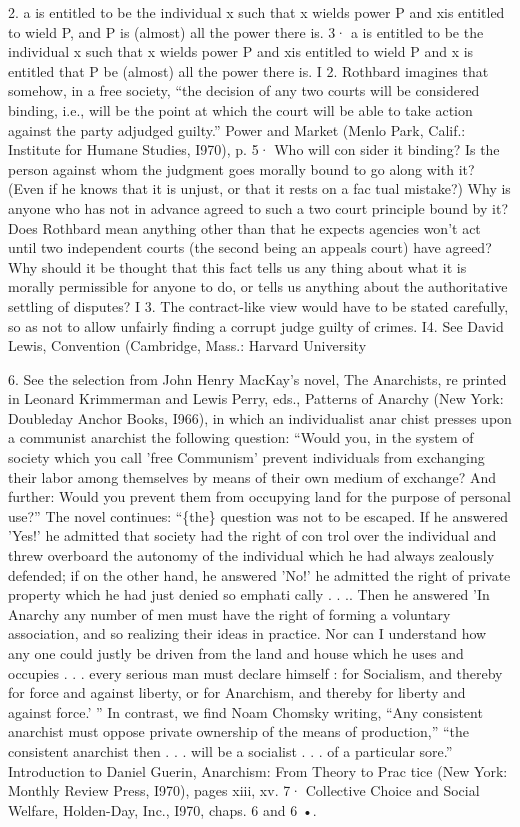 \documentclass[11pt,openany]{book}
\begin{document}
{2. a is entitled to be the individual x such that x wields power P and xis entitled to wield P, and P is (almost) all the power there is. 3· a is entitled to be the individual x such that x wields power P and xis entitled to wield P and x is entitled that P be (almost) all the power there is. I 2. Rothbard imagines that somehow, in a free society, ``the decision of any two courts will be considered binding, i.e., will be the point at which the court will be able to take action against the party adjudged guilty.'' Power and Market (Menlo Park, Calif.: Institute for Humane Studies, I970), p. 5· Who will con sider it binding? Is the person against whom the judgment goes morally bound to go along with it? (Even if he knows that it is unjust, or that it rests on a fac tual mistake?) Why is anyone who has not in advance agreed to such a two court principle bound by it? Does Rothbard mean anything other than that he expects agencies won't act until two independent courts (the second being an appeals court) have agreed? Why should it be thought that this fact tells us any thing about what it is morally permissible for anyone to do, or tells us anything about the authoritative settling of disputes? I 3. The contract-like view would have to be stated carefully, so as not to allow unfairly finding a corrupt judge guilty of crimes. I4. See David Lewis, Convention (Cambridge, Mass.: Harvard University\par

6. See the selection from John Henry MacKay's novel, The Anarchists, re printed in Leonard Krimmerman and Lewis Perry, eds., Patterns of Anarchy (New York: Doubleday Anchor Books, I966), in which an individualist anar chist presses upon a communist anarchist the following question: ``Would you, in the system of society which you call 'free Communism' prevent individuals from exchanging their labor among themselves by means of their own medium of exchange? And further: Would you prevent them from occupying land for the purpose of personal use?'' The novel continues: ``\{the\} question was not to be escaped. If he answered 'Yes!' he admitted that society had the right of con trol over the individual and threw overboard the autonomy of the individual which he had always zealously defended; if on the other hand, he answered 'No!' he admitted the right of private property which he had just denied so emphati cally . . .. Then he answered 'In Anarchy any number of men must have the right of forming a voluntary association, and so realizing their ideas in practice. Nor can I understand how any one could justly be driven from the land and house which he uses and occupies . . . every serious man must declare himself : for Socialism, and thereby for force and against liberty, or for Anarchism, and thereby for liberty and against force.' '' In contrast, we find Noam Chomsky writing, ``Any consistent anarchist must oppose private ownership of the means of production,'' ``the consistent anarchist then . . . will be a socialist . . . of a particular sore.'' Introduction to Daniel Guerin, Anarchism: From Theory to Prac tice (New York: Monthly Review Press, I970), pages xiii, xv. 7· Collective Choice and Social Welfare, Holden-Day, Inc., I970, chaps. 6 and 6 •.\par

}
\end{document}
